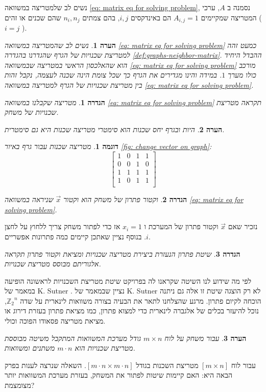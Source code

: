 \documentclass[12pt,leqno]{article}
\theoremstyle{theoremdd}
\newtheorem{definition}{הגדרה}[section]
\newtheorem{example}{דוגמה}[section]
\newtheorem{comm}{הערה}[section]
\newcommand{\Zn}{{\mathbb{Z}_2}^n}
\begin{document}
נשים לב שלמטריצה
במשוואה
\ref{eq: matrix eq for solving problem},
נסמנה 
ב 
$A$,
ערכי המטריצה 
שמקיימים
$A_{i,j} = 1$
הם 
באינדקסים 
$i, j$,
בהם 
צמתים
$n_i, n_j$
שהם שכנים או זהים
(
$i = j$
).
\begin{comm}
    נשים לב שהמטריצה 
    במשוואה 
    \ref{eq: matrix eq for solving problem}
    כמעט זהה למטריצת שכנויות של הגרף 
    שהגדרנו בהגדרה 
    \ref{def:graphs-neighbor-matrix}.
    ההבדל היחיד הוא שהאלכסון הראשי במטריצה
    שבמשוואה 
    \ref{eq: matrix eq for solving problem}
    מורכב כולו מערך 
    $1$.
    במידה והינו מגדירים את הגרף
    כך שכל צומת הינה שכנה לעצמה, נקבל זהות בין מטריצת
    שכנויות של הגרף למטריצה במשוואה  
    \ref{eq: matrix eq for solving problem}.
\end{comm}
\begin{definition}
    \label{def: neighbor matrix}
    מטריצה 
    שקבלנו במשוואה
    \ref{eq: matrix eq for solving problem}
    תקראה מטריצת שכנויות של משחק.
\end{definition}
\begin{comm}
    \label{comm: symetic matrix}
    היות ובגרף יחס שכנות הוא סימטרי מטריצה שכנות היא גם סימטרית.
\end{comm}
\begin{example}
    מטריצה שכנות עבור גרף באיור 
\ref{fig: change vector on graph}:
\[
    \begin{bmatrix}
        1 & 0 & 1 & 1\\
        0 & 0 & 1 & 0\\
        1 & 1 & 1 & 1\\
        1 & 0 & 1 & 1\\
    \end{bmatrix}
\]
\end{example}
\begin{definition}
    \label{ def: solution vector}
    וקטור פתרון של משחק 
    הוא וקטור
    $\vec{x}$
    שניראה
    במשוואה 
    \ref{eq: matrix eq for solving problem}.
\end{definition}
נזכיר שאם
$\vec{x}$
וקטור פתרון של המערכת 
ו
$x_i = 1$
אז כדי לפתור משחק
צריך ללחוץ על לחצן 
$i$.
בנוסף 
נציין שאתכן קיימים כמה פתרונות אפשריים.
\begin{definition}
    \label{def: standard solution}
    שיטת פתרון הנעזרת ביצירת מטריצה שכנויות 
    ומציאת וקטור פתרון
    תקראה
    אלגוריתם מבוסס מטריצת שכנויות.
\end{definition}
לפי מה שידוע לנו
השיטה שקראנו לה בפרויקט שיטת מטריצת השכנויות 
לראשונה הופיעה במאמר של 
\textenglish{K. Sutner}
\cite{B2}.
נציין שבמאמר של 
\textenglish{K. Sutner}
לא רק הוצגה שיטת זו אלה גם 
ניתנה הוכחה לקיום 
פתרון.
מרגע שהצלחנו לתאר את הבעיה
בצורה 
משוואות לינארית
על שדה
$\Zn$,
נוכל להיעזר בכלים של אלגברה לינארית
כדי למצוא פתרון,
כמו מציאת פתרון בעזרת דירוג
או
מציאת מטריצה פסאודו הפוכה וכולי. 
\begin{comm}
    \label{comm: for board too many variables}
    עבור משחק על לוח 
    $m \times n$
    גודל מערכת המשוואות המתקבל משיטה 
    מבוססת מטריצת שכנויות 
    הוא 
    $m \cdot n$
    משתנים ומשוואות.
\end{comm}
עבור לוח 
$[ m \times n ]$
מטריצת השכנות בגודל 
$[ m \cdot n \times m \cdot n ]$.
השאלה שנרצה לענות בפרק הבאה
היא:
האם קיימות שיטות לפתור את המשחק,
בעזרת מערכת המשוואות
יותר מצומצמת?
\end{document}
